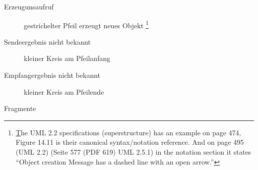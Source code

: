 \documentclass{bschlangaul-theorie}
\begin{document}
\begin{description}
\item[Erzeugunsaufruf]
gestrichelter Pfeil erzeugt neues Objekt
%
\footnote{\href{https://stackoverflow.com/a/2128192} The UML 2.2
specifications (superstructure) has an example on page 474, Figure 14.11
is their canonical syntax/notation reference. And on page 495 (UML 2.2)
(Seite 577 (PDF 619) UML 2.5.1) in the notation section it states
“Object creation Message has a dashed line with an open arrow.”}


\item[Sendeergebnis nicht bekannt]
kleiner Kreis am Pfeilanfang

\item[Empfangergebnis nicht bekannt]
kleiner Kreis am Pfeilende

\item[Fragmente] \strut


\end{description}

\literatur
\end{document}
